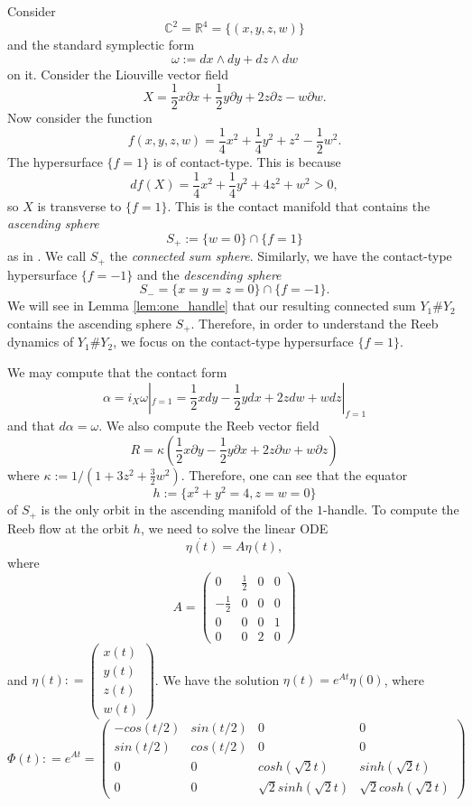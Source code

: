 \documentclass{article}
\numberwithin{equation}{section}
\theoremstyle{definition}
\newcommand{\R}{\mathbb{R}}
\newcommand{\C}{\mathbb{C}}
\begin{document}
Consider
$$\C^2 = \R^4 = \{(x,y,z,w)\}$$ 
and the standard symplectic form
$$\omega:=dx\wedge dy + dz\wedge dw$$
on it. Consider the Liouville vector field 
$$X = \frac{1}{2}x\partial x + \frac{1}{2} y\partial y + 2z \partial z - w\partial w.$$ 
Now consider the function 
$$f(x,y,z,w) = \frac{1}{4}x^2 +\frac{1}{4}y^2 +z^2 - \frac{1}{2}w^2.$$ 
The hypersurface $\{f=1\}$ is of contact-type. This is because
$$df(X) = \frac{1}{4} x^2 +\frac{1}{4}y^2+4 z^2+w^2>0,$$
so $X$ is transverse to $\{f=1\}$. This is the contact manifold that contains the \emph{ascending sphere} $$S_+ := \{w = 0\} \cap \{f=1\}$$ 
as in \cite{Weinstein_one_handle}. We call $S_+$ the \emph{connected sum sphere}. Similarly, we have the contact-type hypersurface $\{f = -1\}$ and the \emph{descending sphere} $$S_- = \{x=y=z=0\}\cap \{f = -1\}.$$ 
We will see in Lemma \ref{lem:one_handle} that our resulting connected sum $Y_1\# Y_2$ contains the ascending sphere $S_+$. Therefore, in order to understand the Reeb dynamics of $Y_1\# Y_2$, we focus on the contact-type hypersurface $\{f = 1\}$.

We may compute that the contact form 
$$\alpha = i_X \omega|_{f=1} = \frac{1}{2}xdy - \frac{1}{2}ydx + 2zdw + wdz|_{f=1}$$ 
and that $d\alpha = \omega$. We also compute the Reeb vector field 
$$R =\kappa (\frac{1}{2}x\partial y - \frac{1}{2}y \partial x + 2z\partial w + w\partial z)$$ 
where $\kappa:= 1/(1+3z^2+\frac{3}{2} w^2)$. Therefore, one can see that the equator 
$$h:=\{x^2+y^2 = 4, z= w =0\}$$
of $S_+$ is the only orbit in the ascending manifold of the $1$-handle. To compute the Reeb flow at the orbit $h$, we need to solve the linear ODE $$\dot{\eta(t)} = A \eta(t),$$ 
where
\begin{equation*}
A = 
\begin{pmatrix}
0 & \frac{1}{2} & 0 & 0 \\
-\frac{1}{2} & 0 & 0 & 0 \\
0 & 0 & 0 & 1 \\
0 & 0 & 2 & 0
\end{pmatrix}
\end{equation*}
and $\eta(t): = \begin{pmatrix}
x(t) \\ y(t) \\ z(t) \\ w(t)
\end{pmatrix}$. We have the solution $\eta(t) = e^{At} \eta(0)$, where 
\begin{equation}
\label{eq:flow}
\Phi(t): = e^{At} = 
\begin{pmatrix}
-cos(t/2) & sin(t/2) & 0 & 0 \\
sin(t/2) & cos(t/2) & 0 & 0 \\
0 & 0 & cosh(\sqrt{2}t) & sinh(\sqrt{2}t) \\
0 & 0 & \sqrt{2}sinh(\sqrt{2}t) & \sqrt{2}cosh(\sqrt{2}t) 
\end{pmatrix}
\end{equation}
\end{document}
